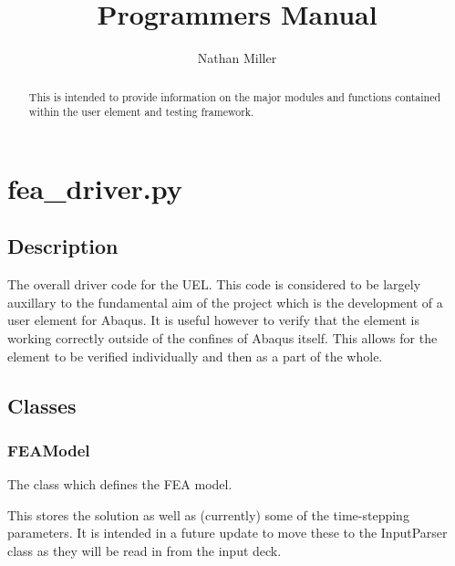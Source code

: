 \documentclass{asme2ej}
\begin{document}
\title{Programmers Manual}
\author{Nathan Miller}

\maketitle

\begin{abstract}

This is intended to provide information on the major modules and functions contained within the user element and testing framework.

\end{abstract}

\tableofcontents
\clearpage

\section{fea\_driver.py}

\subsection{Description}

The overall driver code for the UEL. This code is considered to be largely auxillary to the fundamental aim of the project which is the development of a user element for Abaqus. It is useful however to verify that the element is working correctly outside of the confines of Abaqus itself. This allows for the element to be verified individually and then as a part of the whole.

\subsection{Classes}

\subsubsection{FEAModel}

The class which defines the FEA model.

This stores the solution as well as (currently) some of the time-stepping parameters. It is intended in a future update to move these to the InputParser class as they will be read in from the input deck.
\end{document}
